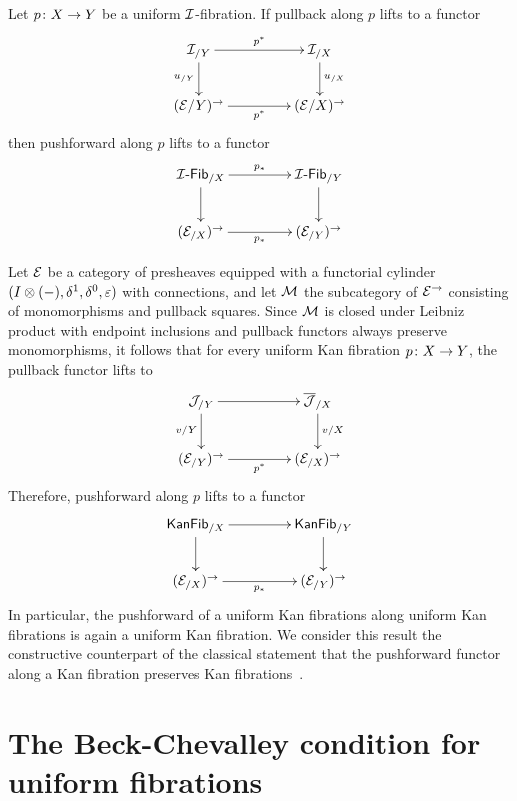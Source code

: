 \documentclass[reqno,10pt,a4paper,oneside,draft]{amsart}
\begin{document}
\begin{corollary}
Let $p \co X \to Y$ be a uniform $\cal{I}$-fibration.
If pullback along $p$ lifts to a functor
\[
\xymatrix@C+2em{
  \cal{I}_{/Y}
  \ar[r]^{p^*}
  \ar[d]_{u_{/Y}}
&
  \cal{I}_{/X}
  \ar[d]^{u_{/X}}
\\
  (\catE / Y)^\to
  \ar[r]_{p^*}
&
  (\catE / X)^\to
}
\]
then pushforward along $p$ lifts to a functor
\[
\xymatrix@C+2em{
  \Fib{\cal{I}}_{/X} \ar[r]^{p_*} \ar[d] & \Fib{\cal{I}}_{/Y} \ar[d] \\
  (\cal{E}_{/X})^\to \ar[r]_{p_*} & (\cal{E}_{/Y})^\to
}
\]
\end{corollary}

\begin{example}
Let $\catE$ be a category of presheaves equipped with a functorial cylinder $( \interval \otimes (-), \rcyl, \lcyl, \ccyl)$ with connections, and let $\cal{M}$ the subcategory of $\catE^\to$ consisting of monomorphisms and pullback squares.
Since $\cal{M}$ is closed under Leibniz product with endpoint inclusions and pullback functors always preserve monomorphisms, it follows that for every uniform Kan fibration $p \co X \to Y$, the pullback functor lifts to
\[
\xymatrix@C+2em{
  \cal{J}_{/Y} \ar[r] \ar[d]_{v/Y} & \overline{\cal{J}}_{/X} \ar[d]^{v/X} \\
  (\cal{E}_{/Y})^\to \ar[r]_{p^*} & (\cal{E}_{/X})^\to
}
\]
Therefore, pushforward along $p$ lifts to a functor
\[
\xymatrix@C+2em{
  \mathsf{KanFib}_{/X} \ar[r] \ar[d]_{} & \mathsf{KanFib}_{/Y} \ar[d] \\
  (\cal{E}_{/X})^\to \ar[r]_{p_*} & (\cal{E}_{/Y})^\to
}
\]
In particular, the pushforward of a uniform Kan fibrations along uniform Kan fibrations is again a uniform Kan fibration. We consider
this result the constructive counterpart of the classical statement that the pushforward functor along a Kan fibration preserves
Kan fibrations~\cite[Lemma~2.3.1]{voevodsky-simplicial-model}.
\end{example}


\section{The Beck-Chevalley condition for uniform fibrations}
\label{sec:becccu}
\end{document}
